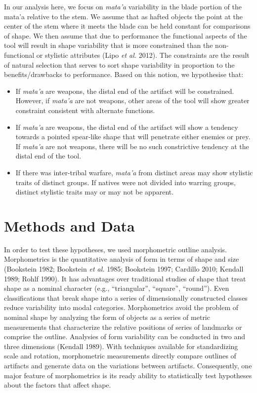\documentclass[]{article}
\begin{document}
In our analysis here, we focus on \emph{mata'a} variability in the blade
portion of the mata'a relative to the stem. We assume that as hafted
objects the point at the center of the stem where it meets the blade can
be held constant for comparisons of shape. We then assume that due to
performance the functional aspects of the tool will result in shape
variability that is more constrained than the non-functional or
stylistic attributes (Lipo \emph{et al.} 2012). The constraints are the
result of natural selection that serves to sort shape variability in
proportion to the benefits/drawbacks to performance. Based on this
notion, we hypothesise that:

\begin{itemize}
\item
  If \emph{mata'a} are weapons, the distal end of the artifact will be
  constrained. However, if \emph{mata'a} are not weapons, other areas of
  the tool will show greater constraint consistent with alternate
  functions.
\item
  If \emph{mata'a} are weapons, the distal end of the artifact will show
  a tendency towards a pointed spear-like shape that will penetrate
  either enemies or prey. If \emph{mata'a} are not weapons, there will
  be no such constrictive tendency at the distal end of the tool.
\item
  If there was inter-tribal warfare, \emph{mata'a} from distinct areas
  may show stylistic traits of distinct groups. If natives were not
  divided into warring groups, distinct stylistic traits may or may not
  be apparent.
\end{itemize}

\section{Methods and Data}\label{methods-and-data}

In order to test these hypotheses, we used morphometric outline
analysis. Morphometrics is the quantitative analysis of form in terms of
shape and size (Bookstein 1982; Bookstein \emph{et al.} 1985; Bookstein
1997; Cardillo 2010; Kendall 1989; Rohlf 1990). It has advantages over
traditional studies of shape that treat shape as a nominal character
(e.g., ``triangular'', ``square'', ``round''). Even classifications that
break shape into a series of dimensionally constructed classes reduce
variability into modal categories. Morphometrics avoid the problem of
nominal shape by analyzing the form of objects as a series of metric
measurements that characterize the relative positions of series of
landmarks or comprise the outline. Analysies of form variability can be
conducted in two and three dimensions (Kendall 1989). With techniques
available for standardizing scale and rotation, morphometric
measurements directly compare outlines of artifacts and generate data on
the variations between artifacts. Consequently, one major feature of
morphometrics is its ready ability to statistically test hypotheses
about the factors that affect shape.
\end{document}

